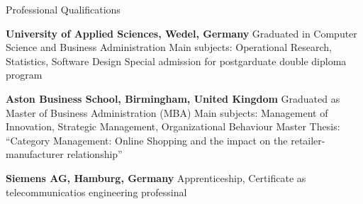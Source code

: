 \begin{rubric}{Professional Qualifications}




\entry*[04/1997--09/2001] \textbf{University of Applied Sciences, Wedel, Germany}\newline
Graduated in Computer Science and Business Administration \newline 
Main subjects: Operational Research, Statistics, Software Design \newline 
Special admission for postgarduate double diploma program

\entry*[10/1999--10/2000] \textbf{Aston Business School, Birmingham, United Kingdom}\newline
Graduated as Master of Business Administration (MBA)\newline 
Main subjects: Management of Innovation, Strategic Management, Organizational Behaviour \newline 
Master Thesis: ``Category Management: Online Shopping and the impact on the retailer-manufacturer relationship''

\entry*[08/1991--02/1995] \textbf{Siemens AG, Hamburg, Germany}\newline 
Apprenticeship, Certificate as telecommunicatios engineering professinal

\end{rubric}
